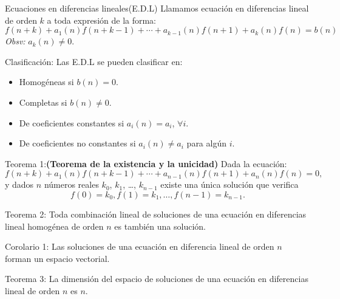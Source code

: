 \begin{frame}
\begin{block}{Ecuaciones en diferencias lineales(E.D.L)}
Llamamos ecuación en diferencias lineal de orden $k$ a toda expresión de la forma:
\[ f\left(n+k\right)+a_{1}(n)f\left(n+k-1\right)+\cdots+a_{k-1}(n)f\left(n+1\right)+a_{k}(n)f\left(n\right)=b\left(n\right) \]
\emph{Obsv:} $a_{k}(n)\neq0$.
\end{block}

\begin{block}{Clasificación:}
Las E.D.L se pueden clasificar en:

\begin{itemize}
	\item Homogéneas si $b(n)=0$.
	\item Completas si $b(n)\neq0$.
	\item De coeficientes constantes si $a_{i}(n)=a_{i}$, $\forall i$.
	\item De coeficientes no constantes si $a_{i}(n)\neq a_{i}$ para algún $i$.
\end{itemize}
\end{block}
\end{frame}

\begin{frame}
\begin{block}{Teorema 1:{\bf (Teorema de la existencia y la unicidad)}}
Dada la ecuación: \[ f\left(n+k\right)+a_{1}(n)f\left(n+k-1\right)+\cdots+a_{n-1}(n)f\left(n+1\right)+a_{n}(n)f\left(n\right)=0, \] y dados $n$ números reales $k_{0}$, $k_{1}$, \ldots, $k_{n-1}$ existe una única solución que verifica \[ f\left(0\right)=k_{0},f\left(1\right)=k_{1},\ldots,f\left(n-1\right)=k_{n-1}. \]
\end{block}

\begin{block}{Teorema 2:}
Toda combinación lineal de soluciones de una ecuación en diferencias lineal homogénea de orden $n$ es también una solución.
\end{block}

\begin{block}{Corolario 1:}
Las soluciones de una ecuación en diferencia lineal de orden $n$ forman un espacio vectorial.
\end{block}

\begin{block}{Teorema 3:}
La dimensión del espacio de soluciones de una ecuación en diferencias lineal de orden $n$ es $n$.
\end{block}
\end{frame}

